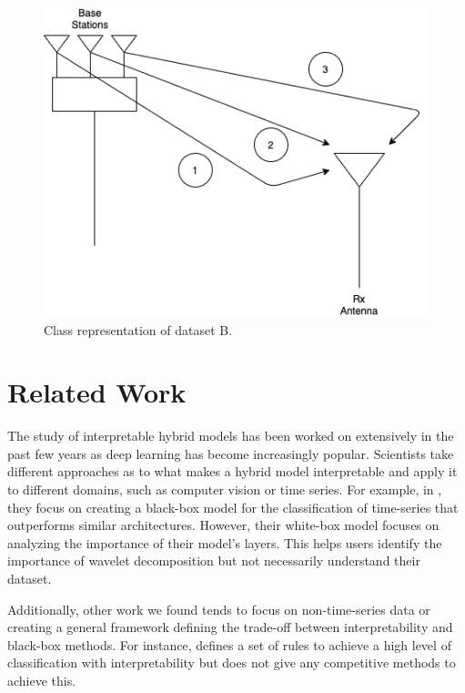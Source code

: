 \documentclass{turabian-thesis}
\begin{document}
\begin{figure}[h!]
   \begin{center}
      \includegraphics[scale=0.5]{../media/dataset_b.png}
   \end{center}
   \caption{Class representation of dataset B.}
   \label{fig:dataset_b}
\end{figure}



\chapter{Related Work}
\label{chap:relatedwork}

The study of interpretable hybrid models has been worked on extensively in the past few years as deep learning has become increasingly popular. Scientists take different approaches as to what makes a hybrid model interpretable and apply it to different domains, such as computer vision or time series. For example, in \cite{wang_multilevel_2018}, they focus on creating a black-box model for the classification of time-series that outperforms similar architectures. However, their white-box model focuses on analyzing the importance of their model's layers. This helps users identify the importance of wavelet decomposition but not necessarily understand their dataset. 

Additionally, other work we found tends to focus on non-time-series data or creating a general framework defining the trade-off between interpretability and black-box methods. For instance, \cite{wang_hybrid_2019} defines a set of rules to achieve a high level of classification with interpretability but does not give any competitive methods to achieve this. 
\end{document}
